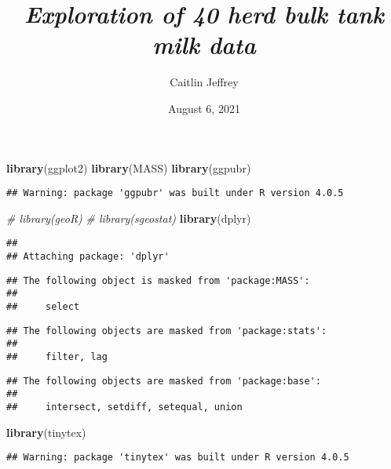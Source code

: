 \documentclass[]{article}
\title{\emph{Exploration of 40 herd bulk tank milk data}}
\author{Caitlin Jeffrey}
\date{August 6, 2021}
\newenvironment{Shaded}{\begin{snugshade}}{\end{snugshade}}
\newcommand{\KeywordTok}[1]{\textcolor[rgb]{0.13,0.29,0.53}{\textbf{#1}}}
\newcommand{\CommentTok}[1]{\textcolor[rgb]{0.56,0.35,0.01}{\textit{#1}}}
\newcommand{\NormalTok}[1]{#1}
\begin{document}
\maketitle

\begin{Shaded}
\begin{Highlighting}[]
\KeywordTok{library}\NormalTok{(ggplot2)}
\KeywordTok{library}\NormalTok{(MASS)}
\KeywordTok{library}\NormalTok{(ggpubr)}
\end{Highlighting}
\end{Shaded}

\begin{verbatim}
## Warning: package 'ggpubr' was built under R version 4.0.5
\end{verbatim}

\begin{Shaded}
\begin{Highlighting}[]
\CommentTok{# library(geoR)}
\CommentTok{# library(sgeostat)}
\KeywordTok{library}\NormalTok{(dplyr)}
\end{Highlighting}
\end{Shaded}

\begin{verbatim}
## 
## Attaching package: 'dplyr'
\end{verbatim}

\begin{verbatim}
## The following object is masked from 'package:MASS':
## 
##     select
\end{verbatim}

\begin{verbatim}
## The following objects are masked from 'package:stats':
## 
##     filter, lag
\end{verbatim}

\begin{verbatim}
## The following objects are masked from 'package:base':
## 
##     intersect, setdiff, setequal, union
\end{verbatim}

\begin{Shaded}
\begin{Highlighting}[]
\KeywordTok{library}\NormalTok{(tinytex)}
\end{Highlighting}
\end{Shaded}

\begin{verbatim}
## Warning: package 'tinytex' was built under R version 4.0.5
\end{verbatim}
\end{document}
